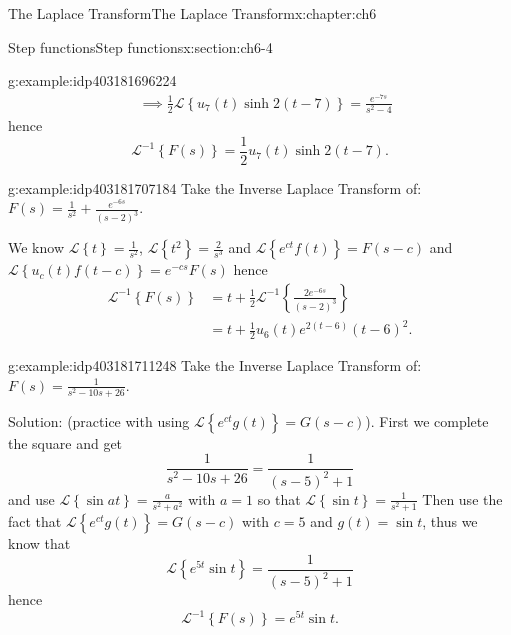 \documentclass[oneside,10pt,]{book}
\numberwithin{equation}{section}
\numberwithin{equation}{section}
\newcommand{\amp}{&}
\begin{document}
\begin{chapterptx}{The Laplace Transform}{}{The Laplace Transform}{}{}{x:chapter:ch6}
\begin{sectionptx}{Step functions}{}{Step functions}{}{}{x:section:ch6-4}
\begin{example}{}{g:example:idp403181696224}
\begin{align*}
\amp \implies\frac{1}{2}\mathcal{L}\left\{ u_{7}(t)\sinh2\left(t-7\right)\right\} =\frac{e^{-7s}}{s^{2}-4}
\end{align*}
hence%
\begin{equation*}
\mathcal{L}^{-1}\left\{ F(s)\right\} =\frac{1}{2}u_{7}(t)\sinh2\left(t-7\right).
\end{equation*}
%
\end{example}
\begin{example}{}{g:example:idp403181707184}%
Take the Inverse Laplace Transform of:\({\displaystyle F(s)=\frac{1}{s^{2}}+\frac{e^{-6s}}{\left(s-2\right)^{3}}}\).%
\par
We know \(\mathcal{L}\left\{ t\right\} =\frac{1}{s^{2}}\), \(\mathcal{L}\left\{ t^{2}\right\} =\frac{2}{s^{3}}\) and \(\mathcal{L}\left\{ e^{ct}f\left(t\right)\right\} =F(s-c)\) and \(\mathcal{L}\left\{ u_{c}(t)f\left(t-c\right)\right\} =e^{-cs}F(s)\) hence%
\begin{align*}
\mathcal{L}^{-1}\left\{ F(s)\right\}  \amp =t+\frac{1}{2}\mathcal{L}^{-1}\left\{ \frac{2e^{-6s}}{\left(s-2\right)^{3}}\right\} \\
\amp =t+\frac{1}{2}u_{6}(t)e^{2(t-6)}(t-6)^{2}.
\end{align*}
%
\end{example}
\begin{example}{}{g:example:idp403181711248}%
Take the Inverse Laplace Transform of: \({\displaystyle F(s)=\frac{1}{s^{2}-10s+26}}\).%
\par
Solution: (practice with using \(\mathcal{L}\left\{ e^{ct}g\left(t\right)\right\} =G(s-c)\)). First we complete the square and get%
\begin{equation*}
\frac{1}{s^{2}-10s+26}=\frac{1}{\left(s-5\right)^{2}+1}
\end{equation*}
and use \(\mathcal{L}\left\{ \sin at\right\} =\frac{a}{s^{2}+a^{2}}\) with \(a=1\) so that \(\mathcal{L}\left\{ \sin t\right\} =\frac{1}{s^{2}+1}\) Then use the fact that \(\mathcal{L}\left\{ e^{ct}g\left(t\right)\right\} =G(s-c)\) with \(c=5\) and \(g(t)=\sin t\), thus we know that%
\begin{equation*}
\mathcal{L}\left\{ e^{5t}\sin t\right\} =\frac{1}{\left(s-5\right)^{2}+1}
\end{equation*}
hence%
\begin{equation*}
\mathcal{L}^{-1}\left\{ F(s)\right\} =e^{5t}\sin t.
\end{equation*}
%
\end{example}
\end{sectionptx}
%
%
\typeout{************************************************}

\end{chapterptx}
\end{document}
